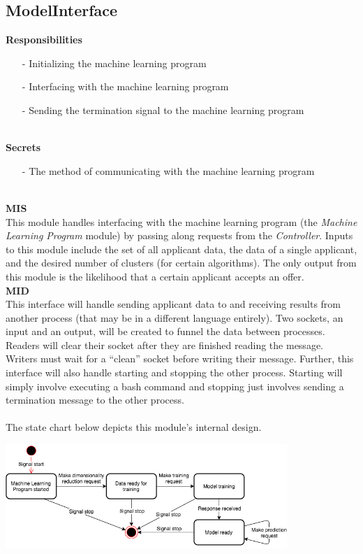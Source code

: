 \documentclass[titlepage]{article}
\begin{document}
\subsection{ModelInterface}
\textbf{Responsibilities}
\begin{itemize}
	\item[-] Initializing the machine learning program
	\item[-] Interfacing with the machine learning program
	\item[-] Sending the termination signal to the machine learning program
\end{itemize}~\\
\textbf{Secrets}
\begin{itemize}
	\item[-] The method of communicating with the machine learning program
\end{itemize}~\\
\newpage
\noindent\textbf{MIS}\\[2mm]
This module handles interfacing with the machine learning program (the \textit{Machine Learning Program} module) by passing along requests from the \textit{Controller}. Inputs to this module include the set of all applicant data, the data of a single applicant, and the desired number of clusters (for certain algorithms). The only output from this module is the likelihood that a certain applicant accepts an offer.\\[6mm]
\textbf{MID}\\[2mm]
This interface will handle sending applicant data to and receiving results from another process (that may be in a different language entirely). Two sockets, an input and an output, will be created to funnel the data between processes. Readers will clear their socket after they are finished reading the message. Writers must wait for a ``clean'' socket before writing their message. Further, this interface will also handle starting and stopping the other process. Starting will simply involve executing a bash command and stopping just involves sending a termination message to the other process.\\~\\
The state chart below depicts this module's internal design.\\
\begin{center}
	\includegraphics[width=0.8\textwidth]{AdvolModelInterfaceStateChart.png}
\label{fig:modelinterface state chart}
\end{center}~\\
\end{document}
